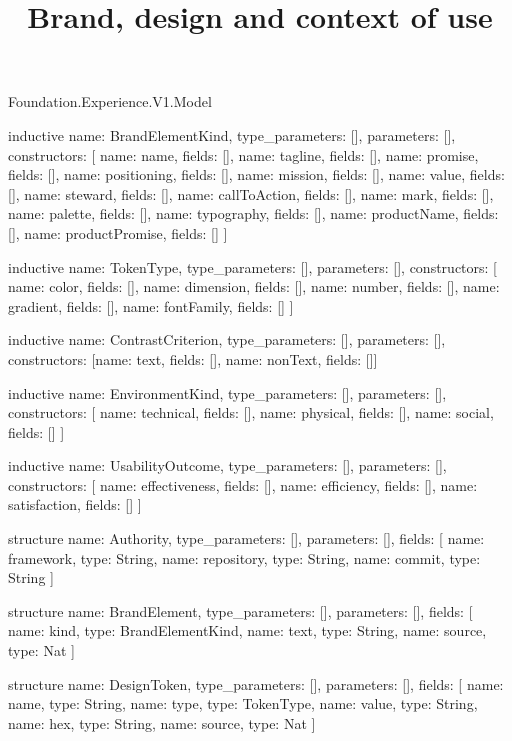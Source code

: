\begin{lexlean}{Foundation.Experience.V1.Model}
\title{Brand, design and context of use}
\begin{semanticmodule}
inductive{
  name: BrandElementKind,
  type_parameters: [],
  parameters: [],
  constructors: [
    {name: name, fields: []},
    {name: tagline, fields: []},
    {name: promise, fields: []},
    {name: positioning, fields: []},
    {name: mission, fields: []},
    {name: value, fields: []},
    {name: steward, fields: []},
    {name: callToAction, fields: []},
    {name: mark, fields: []},
    {name: palette, fields: []},
    {name: typography, fields: []},
    {name: productName, fields: []},
    {name: productPromise, fields: []}
  ]
}

inductive{
  name: TokenType,
  type_parameters: [],
  parameters: [],
  constructors: [
    {name: color, fields: []},
    {name: dimension, fields: []},
    {name: number, fields: []},
    {name: gradient, fields: []},
    {name: fontFamily, fields: []}
  ]
}

inductive{
  name: ContrastCriterion,
  type_parameters: [],
  parameters: [],
  constructors: [{name: text, fields: []}, {name: nonText, fields: []}]
}

inductive{
  name: EnvironmentKind,
  type_parameters: [],
  parameters: [],
  constructors: [
    {name: technical, fields: []},
    {name: physical, fields: []},
    {name: social, fields: []}
  ]
}

inductive{
  name: UsabilityOutcome,
  type_parameters: [],
  parameters: [],
  constructors: [
    {name: effectiveness, fields: []},
    {name: efficiency, fields: []},
    {name: satisfaction, fields: []}
  ]
}

structure{
  name: Authority,
  type_parameters: [],
  parameters: [],
  fields: [
    {name: framework, type: String},
    {name: repository, type: String},
    {name: commit, type: String}
  ]
}

structure{
  name: BrandElement,
  type_parameters: [],
  parameters: [],
  fields: [
    {name: kind, type: BrandElementKind},
    {name: text, type: String},
    {name: source, type: Nat}
  ]
}

structure{
  name: DesignToken,
  type_parameters: [],
  parameters: [],
  fields: [
    {name: name, type: String},
    {name: type, type: TokenType},
    {name: value, type: String},
    {name: hex, type: String},
    {name: source, type: Nat}
  ]
}


\end{semanticmodule}
\end{lexlean}
